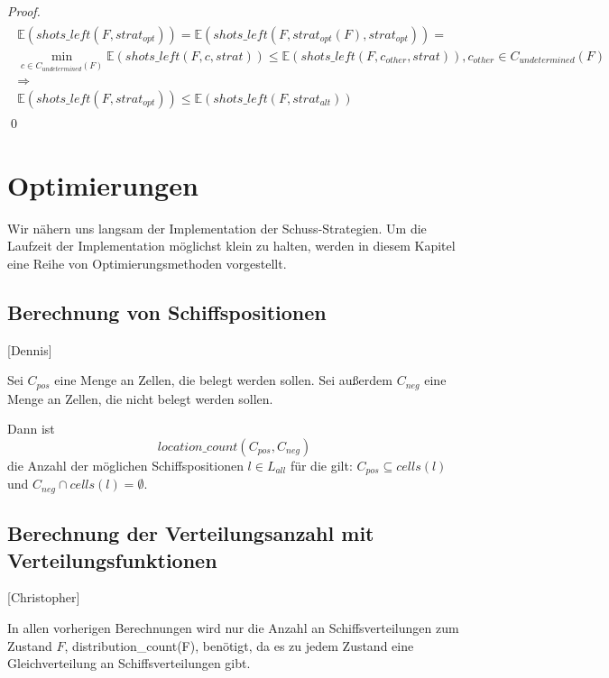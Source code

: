 \documentclass[a4paper,12pt]{llncs}
\numberwithin{equation}{section}
\begin{document}
\begin{proof}
\begin{align}
\begin{split}
\mathds{E}(shots\_left(F, strat_{opt})) =\mathds{E}(shots\_left(F, strat_{opt}(F), strat_{opt}))=\\
\min_{c \in C_{undetermined}(F)} \mathds{E}(shots\_left(F, c, strat)) \leq \mathds{E}(shots\_left(F, c_{other}, strat)), c_{other} \in C_{undetermined}(F)\\
\Rightarrow\\
\mathds{E}(shots\_left(F, strat_{opt})) \leq \mathds{E}(shots\_left(F, strat_{alt}))
\end{split}
\end{align}
\qed
\end{proof}

\newpage

\section{Optimierungen}

Wir nähern uns langsam der Implementation der Schuss-Strategien.
Um die Laufzeit der Implementation möglichst klein zu halten, werden in diesem Kapitel eine Reihe von Optimierungsmethoden vorgestellt.

\subsection{Berechnung von Schiffspositionen}[Dennis]
\begin{definition}
Sei $C_{pos}$ eine Menge an Zellen, die belegt werden sollen. Sei außerdem $C_{neg}$ eine Menge an Zellen, die nicht belegt werden sollen.

Dann ist
\[
location\_count(C_{pos}, C_{neg})
\]
die Anzahl der möglichen Schiffspositionen $l \in L_{all}$ für die gilt: $C_{pos} \subseteq cells(l)$ und $C_{neg} \cap cells(l) = \emptyset$.
\end{definition}

\subsection{Berechnung der Verteilungsanzahl mit Verteilungsfunktionen}[Christopher]

In allen vorherigen Berechnungen wird nur die Anzahl an Schiffsverteilungen zum Zustand $F$, distribution\_count(F), benötigt, da es zu jedem Zustand eine Gleichverteilung an Schiffsverteilungen gibt.
\end{document}
